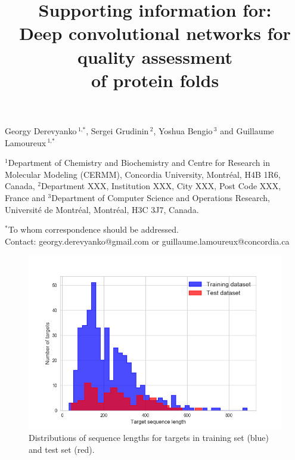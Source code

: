 \documentclass[letter,10pt]{article}
\title{Supporting information for:\\ Deep convolutional networks for quality assessment\\ of protein folds}
\date{}
\begin{document}
\maketitle

\noindent
Georgy Derevyanko\,$^{\text{1,}*}$, Sergei Grudinin\,$^{\text{2}}$, Yoshua Bengio\,$^{\text{3}}$ and Guillaume Lamoureux\,$^{\text{1,}*}$

\vspace{1em}
\noindent
$^{\text{1}}$Department of Chemistry and Biochemistry and Centre for Research in Molecular Modeling (CERMM), Concordia University, Montr{\'e}al, H4B 1R6, Canada,
$^{\text{2}}$Department XXX, Institution XXX, City XXX, Post Code XXX, France and
$^{\text{3}}$Department of Computer Science and Operations Research, Universit{\'e} de Montr{\'e}al, Montr{\'e}al, H3C 3J7, Canada.

\vspace{1em}
\noindent
$^\ast$To whom correspondence should be addressed. \\
Contact: georgy.derevyanko@gmail.com or guillaume.lamoureux@concordia.ca


\newpage
\begin{figure}[H]
    \centering
    \includegraphics[width=\linewidth]{Fig/datasetLengthDistributions.png}
    \caption{Distributions of sequence lengths for targets in training set (blue) and test set (red).}
    \label{Fig:dataLengthDist}
\end{figure}
\end{document}
